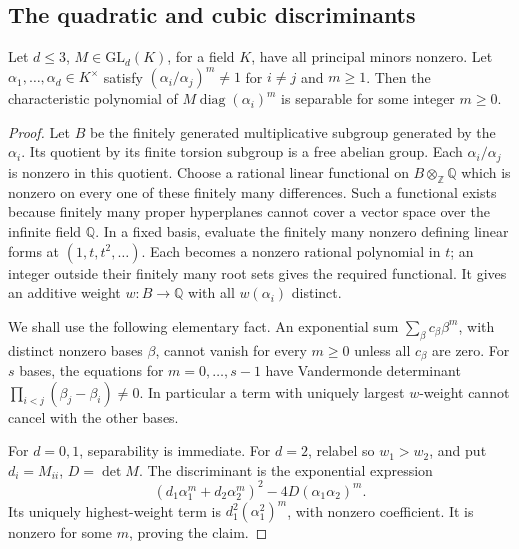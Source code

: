 \subsection{The quadratic and cubic discriminants}
\begin{srlemma}
\label{lem:sr-curve-discriminant}
Let \(d\le3\), \(M\in\mathrm{GL}_d(K)\), for a field \(K\),
have all principal minors nonzero.
Let \(\alpha_1,\ldots,\alpha_d\in K^\times\) satisfy
\((\alpha_i/\alpha_j)^m\ne1\) for \(i\ne j\) and \(m\ge1\).
Then the characteristic polynomial of
\(M\operatorname{diag}(\alpha_i)^m\) is separable for some
integer \(m\ge0\).
\end{srlemma}
\begin{proof}
Let \(B\) be the finitely generated multiplicative subgroup
generated by the \(\alpha_i\).
Its quotient by its finite torsion subgroup is a free
abelian group.  Each \(\alpha_i/\alpha_j\) is nonzero in
this quotient.  Choose a rational linear functional on
\(B\otimes_{\mathbb Z}\mathbb Q\) which is nonzero on every
one of these finitely many differences.
Such a functional exists because finitely many proper
hyperplanes cannot cover a vector space over the infinite
field \(\mathbb Q\). In a fixed basis, evaluate the finitely
many nonzero defining linear forms at \((1,t,t^2,\ldots)\).
Each becomes a nonzero rational polynomial in \(t\); an integer
outside their finitely many root sets gives the required functional.  It gives an additive weight
\(w:B\to\mathbb Q\) with all \(w(\alpha_i)\) distinct.

We shall use the following elementary fact.
An exponential sum \(\sum_{\beta}c_\beta\beta^m\), with
distinct nonzero bases \(\beta\), cannot vanish for every
\(m\ge0\) unless all \(c_\beta\) are zero.
For \(s\) bases, the equations for \(m=0,\ldots,s-1\)
have Vandermonde determinant
\(\prod_{i<j}(\beta_j-\beta_i)\ne0\).
In particular a term with uniquely largest \(w\)-weight
cannot cancel with the other bases.

For \(d=0,1\), separability is immediate.
For \(d=2\), relabel so \(w_1>w_2\), and put
\(d_i=M_{ii}\), \(D=\det M\).
The discriminant is the exponential expression
\[
 (d_1\alpha_1^m+d_2\alpha_2^m)^2
                      -4D(\alpha_1\alpha_2)^m .
\]
Its uniquely highest-weight term is
\(d_1^2(\alpha_1^2)^m\), with nonzero coefficient.
It is nonzero for some \(m\), proving the claim.


\end{proof}
